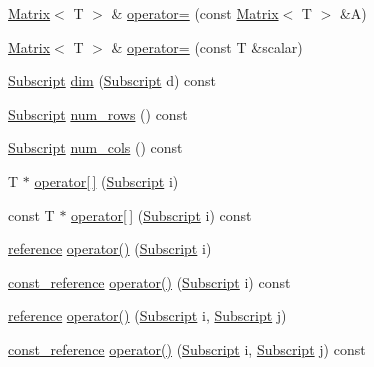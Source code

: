 \begin{DoxyCompactItemize}
\item 
\hyperlink{class_t_n_t_1_1_matrix}{Matrix}$<$ T $>$ \& \hyperlink{class_t_n_t_1_1_matrix_aa038201ce3cfc209613055d82052299a}{operator=} (const \hyperlink{class_t_n_t_1_1_matrix}{Matrix}$<$ T $>$ \&A)
\item 
\hyperlink{class_t_n_t_1_1_matrix}{Matrix}$<$ T $>$ \& \hyperlink{class_t_n_t_1_1_matrix_af09aba37e69f4c7479952bcade58db4d}{operator=} (const T \&scalar)
\item 
\hyperlink{namespace_t_n_t_af22e3f1460e145c04ce4e7d701e4c1c1}{Subscript} \hyperlink{class_t_n_t_1_1_matrix_a2779a7465883a5e400d90b6ba7bb9a79}{dim} (\hyperlink{namespace_t_n_t_af22e3f1460e145c04ce4e7d701e4c1c1}{Subscript} d) const 
\item 
\hyperlink{namespace_t_n_t_af22e3f1460e145c04ce4e7d701e4c1c1}{Subscript} \hyperlink{class_t_n_t_1_1_matrix_a2dbef1a0ca7dfe8cf11a7411e37bbdc7}{num\_\-rows} () const 
\item 
\hyperlink{namespace_t_n_t_af22e3f1460e145c04ce4e7d701e4c1c1}{Subscript} \hyperlink{class_t_n_t_1_1_matrix_af10dfd1ec356fa99acde8f765cb9d247}{num\_\-cols} () const 
\item 
T $\ast$ \hyperlink{class_t_n_t_1_1_matrix_acc34b4e329cdb08e7cd2ee6cd4aa0aac}{operator\mbox{[}$\,$\mbox{]}} (\hyperlink{namespace_t_n_t_af22e3f1460e145c04ce4e7d701e4c1c1}{Subscript} i)
\item 
const T $\ast$ \hyperlink{class_t_n_t_1_1_matrix_aa331865f1b1bff56c14f9a9b03c3f06a}{operator\mbox{[}$\,$\mbox{]}} (\hyperlink{namespace_t_n_t_af22e3f1460e145c04ce4e7d701e4c1c1}{Subscript} i) const 
\item 
\hyperlink{class_t_n_t_1_1_matrix_a129951783800dd85d3dcc1f6dd2062f9}{reference} \hyperlink{class_t_n_t_1_1_matrix_a68a3f310698807a973801db39bcc739d}{operator()} (\hyperlink{namespace_t_n_t_af22e3f1460e145c04ce4e7d701e4c1c1}{Subscript} i)
\item 
\hyperlink{class_t_n_t_1_1_matrix_a6d3ceefbf1675aad4acadac4f78ed04b}{const\_\-reference} \hyperlink{class_t_n_t_1_1_matrix_a12abffc9de83f44ed07aaa53d87252ae}{operator()} (\hyperlink{namespace_t_n_t_af22e3f1460e145c04ce4e7d701e4c1c1}{Subscript} i) const 
\item 
\hyperlink{class_t_n_t_1_1_matrix_a129951783800dd85d3dcc1f6dd2062f9}{reference} \hyperlink{class_t_n_t_1_1_matrix_a47404159b33c55161f4eb8e974c1592c}{operator()} (\hyperlink{namespace_t_n_t_af22e3f1460e145c04ce4e7d701e4c1c1}{Subscript} i, \hyperlink{namespace_t_n_t_af22e3f1460e145c04ce4e7d701e4c1c1}{Subscript} j)
\item 
\hyperlink{class_t_n_t_1_1_matrix_a6d3ceefbf1675aad4acadac4f78ed04b}{const\_\-reference} \hyperlink{class_t_n_t_1_1_matrix_ada75a1fb62b3251a572b2d19edb0a620}{operator()} (\hyperlink{namespace_t_n_t_af22e3f1460e145c04ce4e7d701e4c1c1}{Subscript} i, \hyperlink{namespace_t_n_t_af22e3f1460e145c04ce4e7d701e4c1c1}{Subscript} j) const 
\end{DoxyCompactItemize}
